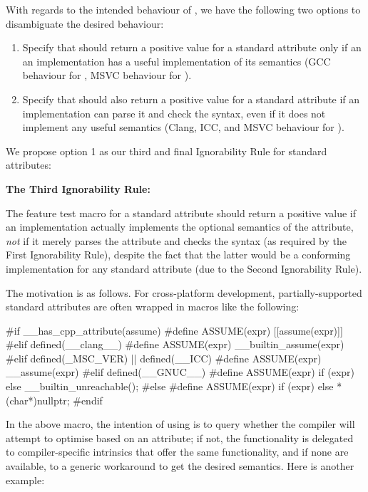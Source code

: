 With regards to the intended behaviour of , we have the following two options to disambiguate the desired behaviour:
\begin{enumerate}
\item Specify that  should return a positive value for a standard attribute only if an an implementation has a useful implementation of its semantics (GCC behaviour for , MSVC behaviour for ).
\item Specify that  should also return a positive value for a standard attribute if an implementation can parse it and check the syntax, even if it does not implement any useful semantics (Clang, ICC, and MSVC behaviour for ).
\end{enumerate}

We propose option 1 as our third and final Ignorability Rule for standard attributes:

\begin{adjustwidth}{0.5cm}{0.5cm}
\textbf{The Third Ignorability Rule:}

The feature test macro for a standard attribute should return a positive value if an implementation actually implements the optional semantics of the attribute, \emph{not} if it merely parses the attribute and checks the syntax (as required by the First Ignorability Rule), despite the fact that the latter would be a conforming implementation for any standard attribute (due to the Second Ignorability Rule).
\end{adjustwidth}

The motivation is as follows. For cross-platform development, partially-supported standard attributes are often wrapped in macros like the following:

\begin{codeblock}
#if __has_cpp_attribute(assume)
  #define ASSUME(expr) [[assume(expr)]]
#elif defined(__clang__)
  #define ASSUME(expr) __builtin_assume(expr) 
#elif defined(_MSC_VER) || defined(__ICC)
  #define ASSUME(expr) __assume(expr) 
#elif defined(__GNUC__) 
  #define ASSUME(expr) if (expr) {} else { __builtin_unreachable(); }
#else
  #define ASSUME(expr) if (expr) {} else { *(char*)nullptr; }
#endif
\end{codeblock}

In the above macro, the intention of using  is to query whether the compiler will attempt to optimise based on an  attribute; if not, the functionality is delegated to compiler-specific intrinsics that offer the same functionality, and if none are available, to a generic workaround to get the desired semantics. Here is another example:


